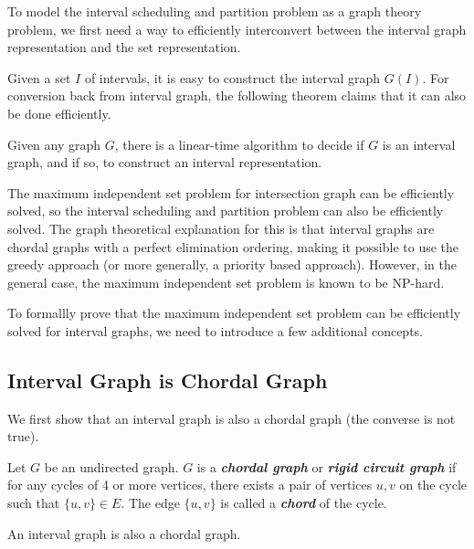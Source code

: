 To model the interval scheduling and partition problem as a graph theory problem, we first need a way to efficiently interconvert between the interval graph representation and the set representation.

Given a set $I$ of intervals, it is easy to construct the interval graph $G(I)$. For conversion back from interval graph, the following theorem claims that it can also be done efficiently.

\begin{theorem}
    Given any graph $G$, there is a linear-time algorithm to decide if $G$ is an interval graph, and if so, to construct an interval representation.
\end{theorem}

The maximum independent set problem for intersection graph can be efficiently solved, so the interval scheduling and partition problem can also be efficiently solved. The graph theoretical explanation for this is that interval graphs are chordal graphs with a perfect elimination ordering, making it possible to use the greedy approach (or more generally, a priority based approach). However, in the general case, the maximum independent set problem is known to be NP-hard.

To formallly prove that the maximum independent set problem can be efficiently solved for interval graphs, we need to introduce a few additional concepts.

\subsection{Interval Graph is Chordal Graph}

We first show that an interval graph is also a chordal graph (the converse is not true).

\begin{definition}   
    Let $G$ be an undirected graph. $G$ is a \textit{\textbf{chordal graph}} or \textit{\textbf{rigid circuit graph}} if for any cycles of 4 or more vertices, there exists a pair of vertices $u,v$ on the cycle such that $\{u,v\} \in E$. The edge $\{u,v\}$ is called a \textit{\textbf{chord}} of the cycle.
\end{definition}

\vspace{\parskip}

\begin{theorem}
    An interval graph is also a chordal graph.
\end{theorem}

